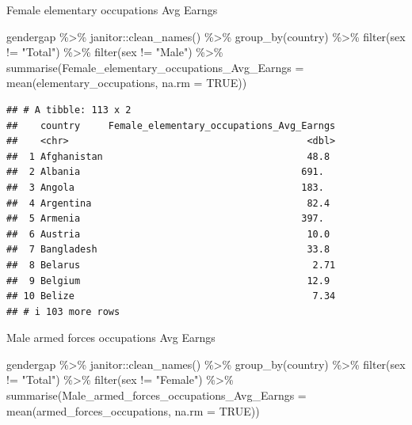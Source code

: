 \documentclass[
]{article}
\newenvironment{Shaded}{\begin{snugshade}}{\end{snugshade}}
\newcommand{\AttributeTok}[1]{\textcolor[rgb]{0.77,0.63,0.00}{#1}}
\newcommand{\ConstantTok}[1]{\textcolor[rgb]{0.00,0.00,0.00}{#1}}
\newcommand{\FunctionTok}[1]{\textcolor[rgb]{0.00,0.00,0.00}{#1}}
\newcommand{\NormalTok}[1]{#1}
\newcommand{\SpecialCharTok}[1]{\textcolor[rgb]{0.00,0.00,0.00}{#1}}
\newcommand{\StringTok}[1]{\textcolor[rgb]{0.31,0.60,0.02}{#1}}
\begin{document}
Female elementary occupations Avg Earngs

\begin{Shaded}
\begin{Highlighting}[]
\NormalTok{gendergap }\SpecialCharTok{\%\textgreater{}\%}
\NormalTok{  janitor}\SpecialCharTok{::}\FunctionTok{clean\_names}\NormalTok{() }\SpecialCharTok{\%\textgreater{}\%}
  \FunctionTok{group\_by}\NormalTok{(country) }\SpecialCharTok{\%\textgreater{}\%} 
   \FunctionTok{filter}\NormalTok{(sex }\SpecialCharTok{!=} \StringTok{"Total"}\NormalTok{) }\SpecialCharTok{\%\textgreater{}\%}
  \FunctionTok{filter}\NormalTok{(sex }\SpecialCharTok{!=} \StringTok{"Male"}\NormalTok{) }\SpecialCharTok{\%\textgreater{}\%}
  \FunctionTok{summarise}\NormalTok{(}\AttributeTok{Female\_elementary\_occupations\_Avg\_Earngs =} \FunctionTok{mean}\NormalTok{(elementary\_occupations, }\AttributeTok{na.rm =} \ConstantTok{TRUE}\NormalTok{))}
\end{Highlighting}
\end{Shaded}

\begin{verbatim}
## # A tibble: 113 x 2
##    country     Female_elementary_occupations_Avg_Earngs
##    <chr>                                          <dbl>
##  1 Afghanistan                                    48.8 
##  2 Albania                                       691.  
##  3 Angola                                        183.  
##  4 Argentina                                      82.4 
##  5 Armenia                                       397.  
##  6 Austria                                        10.0 
##  7 Bangladesh                                     33.8 
##  8 Belarus                                         2.71
##  9 Belgium                                        12.9 
## 10 Belize                                          7.34
## # i 103 more rows
\end{verbatim}

Male armed forces occupations Avg Earngs

\begin{Shaded}
\begin{Highlighting}[]
\NormalTok{gendergap }\SpecialCharTok{\%\textgreater{}\%}
\NormalTok{  janitor}\SpecialCharTok{::}\FunctionTok{clean\_names}\NormalTok{() }\SpecialCharTok{\%\textgreater{}\%}
  \FunctionTok{group\_by}\NormalTok{(country) }\SpecialCharTok{\%\textgreater{}\%} 
   \FunctionTok{filter}\NormalTok{(sex }\SpecialCharTok{!=} \StringTok{"Total"}\NormalTok{) }\SpecialCharTok{\%\textgreater{}\%}
  \FunctionTok{filter}\NormalTok{(sex }\SpecialCharTok{!=} \StringTok{"Female"}\NormalTok{) }\SpecialCharTok{\%\textgreater{}\%}
  \FunctionTok{summarise}\NormalTok{(}\AttributeTok{Male\_armed\_forces\_occupations\_Avg\_Earngs =} \FunctionTok{mean}\NormalTok{(armed\_forces\_occupations, }\AttributeTok{na.rm =} \ConstantTok{TRUE}\NormalTok{))}
\end{Highlighting}
\end{Shaded}
\end{document}
